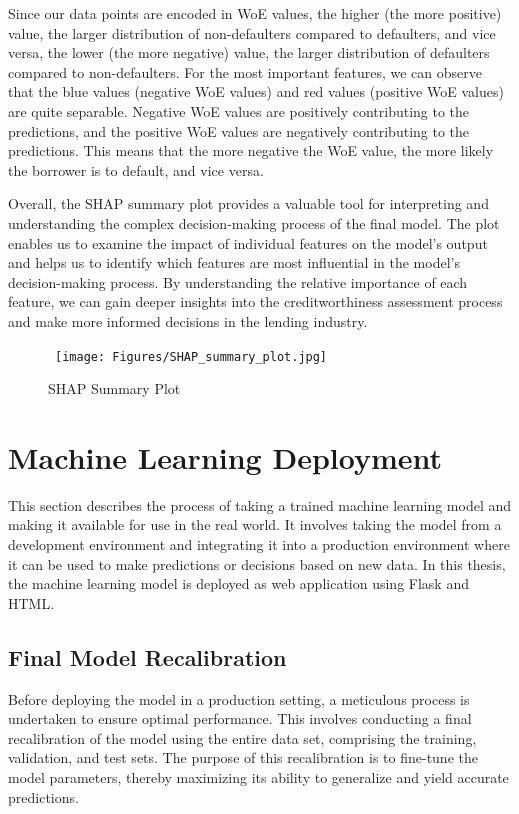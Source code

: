 Since our data points are encoded in WoE values, the higher (the more positive) value, the larger distribution of non-defaulters compared to defaulters, and vice versa, the lower (the more negative) value, the larger distribution of defaulters compared to non-defaulters.
For the most important features, we can observe that the blue values (negative WoE values) and red values (positive WoE values) are quite separable.
Negative WoE values are positively contributing to the predictions, and the positive WoE values are negatively contributing to the predictions. This means that the more negative the WoE value, the more likely the borrower is to default, and vice versa.

Overall, the SHAP summary plot provides a valuable tool for interpreting and understanding the complex decision-making process of the final model.
The plot enables us to examine the impact of individual features on the model's output and helps us to identify which features are most influential in the model's decision-making process.
By understanding the relative importance of each feature, we can gain deeper insights into the creditworthiness assessment process and make more informed decisions in the lending industry.

\begin{figure}[H]
\centering
\caption{SHAP Summary Plot}\vspace{0.5em}
\label{fig:shap}\
\texttt{[image: Figures/SHAP\_summary\_plot.jpg]}
\vspace{-1em}
\end{figure}


\newpage
\section{Machine Learning Deployment}
This section describes the process of taking a trained machine learning model and making it available for use in the real world. It involves taking the model from a development environment and integrating it into a production environment where it can be used to make predictions or decisions based on new data. In this thesis, the machine learning model is deployed as web application using Flask and HTML.
\subsection{Final Model Recalibration}
Before deploying the model in a production setting, a meticulous process is undertaken to ensure optimal performance.
This involves conducting a final recalibration of the model using the entire data set, comprising the training, validation, and test sets.
The purpose of this recalibration is to fine-tune the model parameters, thereby maximizing its ability to generalize and yield accurate predictions.

